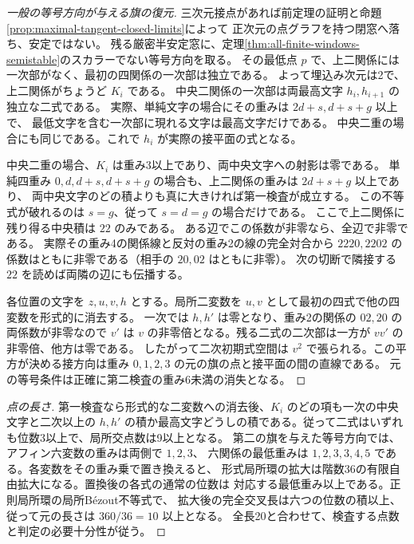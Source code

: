 \begin{proof}[一般の等号方向が与える旗の復元]
三次元接点があれば前定理の証明と命題\ref{prop:maximal-tangent-closed-limits}によって
正次元の点グラフを持つ閉窓へ落ち、安定ではない。
残る厳密半安定窓に、定理\ref{thm:all-finite-windows-semistable}のスカラーでない等号方向を取る。
その最低点 $p$ で、上二関係には一次部がなく、最初の四関係の一次部は独立である。
よって埋込み次元は2で、上二関係がちょうど $K_i$ である。
中央二関係の一次部は両最高文字 $h_i,h_{i+1}$ の独立な二式である。
実際、単純文字の場合にその重みは $2d+s,d+s+g$ 以上で、
最低文字を含む一次部に現れる文字は最高文字だけである。
中央二重の場合にも同じである。これで $h_i$ が実際の接平面の式となる。

中央二重の場合、$K_i$ は重み3以上であり、両中央文字への射影は零である。
単純四重み $0,d,d+s,d+s+g$ の場合も、上二関係の重みは $2d+s+g$ 以上であり、
両中央文字のどの積よりも真に大きければ第一検査が成立する。
この不等式が破れるのは $s=g$、従って $s=d=g$ の場合だけである。
ここで上二関係に残り得る中央積は $22$ のみである。
ある辺でこの係数が非零なら、全辺で非零である。
実際その重み4の関係線と反対の重み2の線の完全対合から
$2220,2202$ の係数はともに非零である（相手の $20,02$ はともに非零）。
次の切断で隣接する $22$ を読めば両隣の辺にも伝播する。

各位置の文字を $z,u,v,h$ とする。局所二変数を $u,v$ として最初の四式で他の四変数を形式的に消去する。
一次では $h,h'$ は零となり、重み2の関係の $02,20$ の両係数が非零なので
$v'$ は $v$ の非零倍となる。残る二式の二次部は一方が $vv'$ の非零倍、他方は零である。
したがって二次初期式空間は $v^2$ で張られる。この平方が決める接方向は重み
$0,1,2,3$ の元の旗の点と接平面の間の直線である。
元の等号条件は正確に第二検査の重み6未満の消失となる。
\end{proof}

\begin{proof}[点の長さ]
第一検査なら形式的な二変数への消去後、$K_i$ のどの項も一次の中央文字と二次以上の
$h,h'$ の積か最高文字どうしの積である。従って二式はいずれも位数3以上で、局所交点数は9以上となる。
第二の旗を与えた等号方向では、アフィン六変数の重みは両側で $1,2,3$、
六関係の最低重みは $1,2,3,3,4,5$ である。各変数をその重み乗で置き換えると、
形式局所環の拡大は階数36の有限自由拡大になる。置換後の各式の通常の位数は
対応する最低重み以上である。正則局所環の局所Bézout不等式で、
拡大後の完全交叉長は六つの位数の積以上、従って元の長さは $360/36=10$ 以上となる。
全長20と合わせて、検査する点数と判定の必要十分性が従う。
\end{proof}
